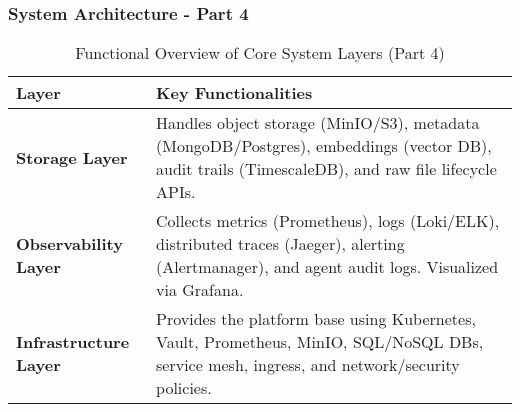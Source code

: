 \documentclass{beamer}
\begin{document}
\begin{frame}
  \frametitle{System Architecture - Part 4}
 \begin{table}[h!]
\centering
\renewcommand{\arraystretch}{1.2}
\begin{tabular}{|p{3cm}|p{7cm}|}
\hline
\textbf{Layer} & \textbf{Key Functionalities} \\
\hline

\textbf{Storage Layer} & 
Handles object storage (MinIO/S3), metadata (MongoDB/Postgres), embeddings (vector DB), audit trails (TimescaleDB), and raw file lifecycle APIs. \\
\hline

\textbf{Observability Layer} & 
Collects metrics (Prometheus), logs (Loki/ELK), distributed traces (Jaeger), alerting (Alertmanager), and agent audit logs. Visualized via Grafana. \\
\hline

\textbf{Infrastructure Layer} & 
Provides the platform base using Kubernetes, Vault, Prometheus, MinIO, SQL/NoSQL DBs, service mesh, ingress, and network/security policies. \\
\hline

\end{tabular}
\caption{Functional Overview of Core System Layers (Part 4)}
\end{table}
\end{frame}
\end{document}
